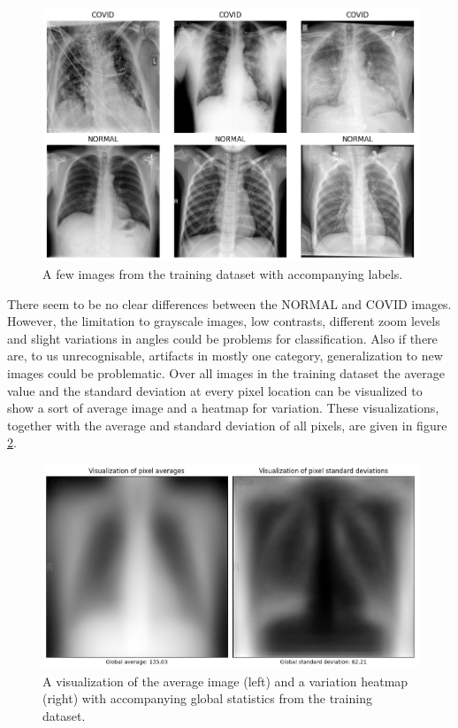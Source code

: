 \documentclass[conference]{IEEEtran}
\begin{document}
\begin{figure}[htbp]
\centerline{\includegraphics[width=\linewidth]{Images/example_images.png}}
\caption{A few images from the training dataset with accompanying labels.}
\label{fig:example_images}
\end{figure}

There seem to be no clear differences between the NORMAL and COVID images. However, the limitation to grayscale images, low contrasts, different zoom levels and slight variations in angles could be problems for classification. Also if there are, to us unrecognisable, artifacts in mostly one category, generalization to new images could be problematic.
Over all images in the training dataset the average value and the standard deviation at every pixel location can be visualized to show a sort of average image and a heatmap for variation. These visualizations, together with the average and standard deviation of all pixels, are given in figure \ref{fig:pixel_statistics}.

\begin{figure}[htbp]
\centerline{\includegraphics[width=\linewidth]{Images/pixel_statistics.png}}
\caption{A visualization of the average image (left) and a variation heatmap (right) with accompanying global statistics from the training dataset.}
\label{fig:pixel_statistics}
\end{figure}
\end{document}
